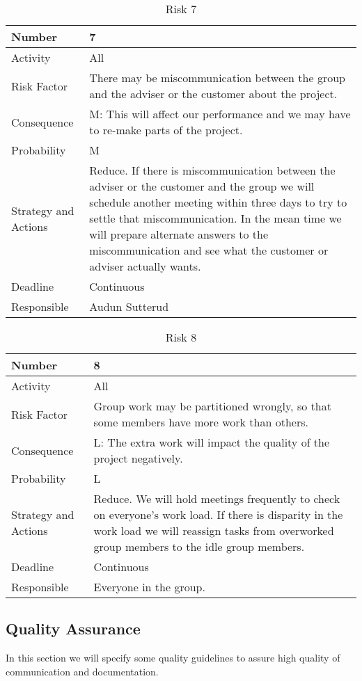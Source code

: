 \documentclass[../document.tex]{subfiles}
\begin{document}
\begin{table}[H]
\caption{Risk 7}
\begin{tabularx}{\textwidth}{|l|X|}
\hline
Number
&7
\\ \hline Activity
&All
\\ \hline Risk Factor
&There may be miscommunication between the group and the adviser or the customer about the project.
\\ \hline Consequence
&M: This will affect our performance and we may have to re-make parts of the project.
\\ \hline Probability
&M
\\ \hline Strategy and Actions
&Reduce. If there is miscommunication between the adviser or the customer and the group we will schedule another meeting within three days to try to settle that miscommunication. In the mean time we will prepare alternate answers to the miscommunication and see what the customer or adviser actually wants.
\\ \hline Deadline
&Continuous
\\ \hline Responsible
&Audun Sutterud
\\ \hline 
\end{tabularx}
\end{table}

\begin{table}[H]
\caption{Risk 8}
\begin{tabularx}{\textwidth}{|l|X|}
\hline
Number
&8
\\ \hline Activity
&All
\\ \hline Risk Factor
&Group work may be partitioned wrongly, so that some members have more work than others.
\\ \hline Consequence
&L: The extra work will impact the quality of the project negatively.
\\ \hline Probability
&L
\\ \hline Strategy and Actions
&Reduce. We will hold meetings frequently to check on everyone's work load. If there is disparity in the work load we will reassign tasks from overworked group members to the idle group members.
\\ \hline Deadline
&Continuous
\\ \hline Responsible
&Everyone in the group.
\\ \hline 
\end{tabularx}
\end{table}

\subsection{Quality Assurance}
In this section we will specify some quality guidelines to assure high quality of communication and documentation.
\end{document}
